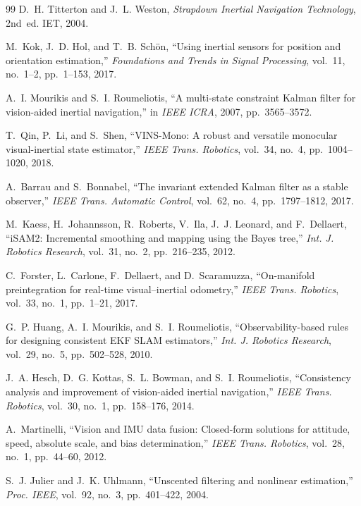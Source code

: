 \documentclass[11pt]{article}
\begin{document}
\begin{thebibliography}{99}
D.~H. Titterton and J.~L. Weston, \emph{Strapdown Inertial Navigation Technology}, 2nd~ed. IET, 2004.

M.~Kok, J.~D. Hol, and T.~B. Sch\"on, ``Using inertial sensors for position and orientation
estimation,'' \emph{Foundations and Trends in Signal Processing}, vol.~11, no.~1--2, pp.~1--153, 2017.

A.~I. Mourikis and S.~I. Roumeliotis, ``A multi-state constraint Kalman filter for vision-aided
inertial navigation,'' in \emph{IEEE ICRA}, 2007, pp.~3565--3572.

T.~Qin, P.~Li, and S.~Shen, ``VINS-Mono: A robust and versatile monocular visual-inertial state
estimator,'' \emph{IEEE Trans. Robotics}, vol.~34, no.~4, pp.~1004--1020, 2018.

A.~Barrau and S.~Bonnabel, ``The invariant extended Kalman filter as a stable observer,''
\emph{IEEE Trans. Automatic Control}, vol.~62, no.~4, pp.~1797--1812, 2017.

M.~Kaess, H.~Johannsson, R.~Roberts, V.~Ila, J.~J. Leonard, and F.~Dellaert, ``iSAM2: Incremental
smoothing and mapping using the Bayes tree,'' \emph{Int. J. Robotics Research}, vol.~31, no.~2,
pp.~216--235, 2012.

C.~Forster, L.~Carlone, F.~Dellaert, and D.~Scaramuzza, ``On-manifold preintegration for real-time
visual--inertial odometry,'' \emph{IEEE Trans. Robotics}, vol.~33, no.~1, pp.~1--21, 2017.

G.~P. Huang, A.~I. Mourikis, and S.~I. Roumeliotis, ``Observability-based rules for designing
consistent EKF SLAM estimators,'' \emph{Int. J. Robotics Research}, vol.~29, no.~5, pp.~502--528, 2010.

J.~A. Hesch, D.~G. Kottas, S.~L. Bowman, and S.~I. Roumeliotis, ``Consistency analysis and improvement
of vision-aided inertial navigation,'' \emph{IEEE Trans. Robotics}, vol.~30, no.~1, pp.~158--176, 2014.

A.~Martinelli, ``Vision and IMU data fusion: Closed-form solutions for attitude, speed, absolute scale,
and bias determination,'' \emph{IEEE Trans. Robotics}, vol.~28, no.~1, pp.~44--60, 2012.

S.~J. Julier and J.~K. Uhlmann, ``Unscented filtering and nonlinear estimation,''
\emph{Proc. IEEE}, vol.~92, no.~3, pp.~401--422, 2004.


\end{thebibliography}
\end{document}
